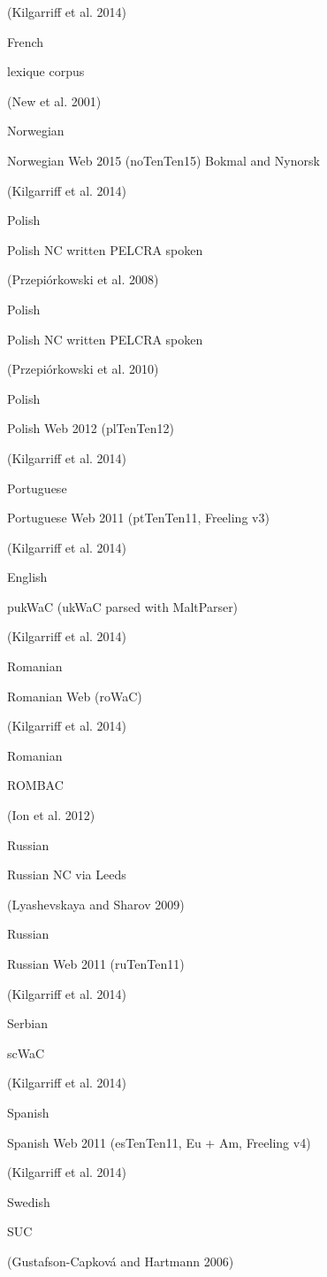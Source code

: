 \documentclass[]{article}
\begin{document}
(Kilgarriff et al. 2014)

French

lexique corpus

(New et al. 2001)

Norwegian

Norwegian Web 2015 (noTenTen15) Bokmal and Nynorsk

(Kilgarriff et al. 2014)

Polish

Polish NC written PELCRA spoken

(Przepiórkowski et al. 2008)

Polish

Polish NC written PELCRA spoken

(Przepiórkowski et al. 2010)

Polish

Polish Web 2012 (plTenTen12)

(Kilgarriff et al. 2014)

Portuguese

Portuguese Web 2011 (ptTenTen11, Freeling v3)

(Kilgarriff et al. 2014)

English

pukWaC (ukWaC parsed with MaltParser)

(Kilgarriff et al. 2014)

Romanian

Romanian Web (roWaC)

(Kilgarriff et al. 2014)

Romanian

ROMBAC

(Ion et al. 2012)

Russian

Russian NC via Leeds

(Lyashevskaya and Sharov 2009)

Russian

Russian Web 2011 (ruTenTen11)

(Kilgarriff et al. 2014)

Serbian

scWaC

(Kilgarriff et al. 2014)

Spanish

Spanish Web 2011 (esTenTen11, Eu + Am, Freeling v4)

(Kilgarriff et al. 2014)

Swedish

SUC

(Gustafson-Capková and Hartmann 2006)
\end{document}

